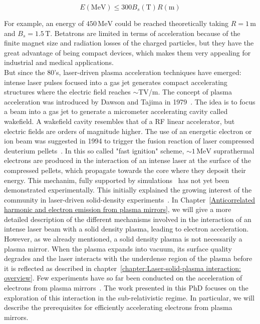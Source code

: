 \begin{equation}
E(\mathrm{MeV}) \le 300 B_s(\mathrm{T}) R(\mathrm{m})
\end{equation}

\noindent For example, an energy of $450\,\mathrm{MeV}$ could be reached theoretically taking $R = 1\,\mathrm{m}$ and $B_{s} = 1.5\,\mathrm{T}$. Betatrons are limited in terms of acceleration because of the finite magnet size and radiation losses of the charged particles, but they have the great advantage of being compact devices, which makes them very appealing for industrial and medical applications.\\

\noindent But since the 80's, laser-driven plasma acceleration techniques have emerged: intense laser pulses focused into a gas jet generates compact accelerating structures where the electric field reaches $\sim $TV/m. The concept of plasma acceleration was introduced by Dawson and Tajima in 1979~\cite{tajima1979laser}. The idea is to focus a beam into a gas jet to generate a micrometer accelerating cavity called wakefield. A wakefield cavity resembles that of a RF linear accelerator, but electric fields are orders of magnitude higher. The use of an energetic electron or ion beam was suggested in 1994 to trigger the fusion reaction of laser compressed deuterium pellets~\cite{tabak1994ignition}. In this so called "fast ignition" scheme, $\sim 1\,\mathrm{MeV}$ suprathermal electrons are produced in the interaction of an intense laser at the surface of the compressed pellets, which propagate towards the core where they deposit their energy. This mechanim, fully supported by simulations~\cite{tabak1994ignition} has not yet been demonstrated experimentally. This initially explained the growing interest of the community in laser-driven solid-density experiments~\cite{honrubia2006three,Brunel1987,Gibbon1992,askar1994magnetic,pukhov1996relativistic,sheng2002stochastic}. In Chapter~\ref{Anticorrelated harmonic and electron emission from plasma mirrors}, we will give a more detailed description of the different mechanisms involved in the interaction of an intense laser beam with a solid density plasma, leading to electron acceleration. \\

\noindent However, as we already mentioned, a solid density plasma is not necessarily a plasma mirror. When the plasma expands into vacuum, its surface quality degrades and the laser interacts with the underdense region of the plasma before it is reflected as described in chapter~\ref{chapter:Laser-solid-plasma interaction: overview}. Few experiments have so far been conducted on the acceleration of electrons from plasma mirrors~\cite{mordovanakis2009quasimonoenergetic,thevenet2015}. The work presented in this PhD focuses on the exploration of this interaction in the sub-relativistic regime. In particular, we will describe the prerequisites for efficiently accelerating electrons from plasma mirrors.



